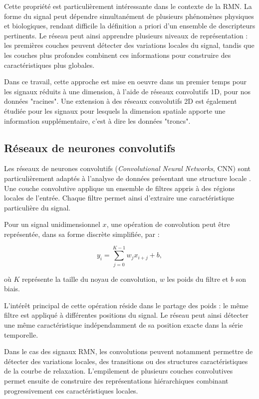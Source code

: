 \documentclass[12pt,a4paper,twoside]{article}
\begin{document}
Cette propriété est particulièrement intéressante dans le contexte de la RMN. La forme du signal peut dépendre simultanément de plusieurs phénomènes physiques et biologiques, rendant difficile la définition a priori d'un ensemble de descripteurs pertinents. Le réseau peut ainsi apprendre plusieurs niveaux de représentation : les premières couches peuvent détecter des variations locales du signal, tandis que les couches plus profondes combinent ces informations pour construire des caractéristiques plus globales.

Dans ce travail, cette approche est mise en oeuvre dans un premier temps pour les signaux réduits à une dimension, à l'aide de réseaux convolutifs 1D, pour nos données "racines". Une extension à des réseaux convolutifs 2D est également étudiée pour les signaux pour lesquels la dimension spatiale apporte une information supplémentaire, c'est à dire les données "troncs".

\subsection{Réseaux de neurones convolutifs}
\label{subsec:cnn}

Les réseaux de neurones convolutifs (\textit{Convolutional Neural Networks}, CNN) sont particulièrement adaptés à l'analyse de données présentant une structure locale \cite{LeCun2015}. Une couche convolutive applique un ensemble de filtres appris à des régions locales de l'entrée. Chaque filtre permet ainsi d'extraire une caractéristique particulière du signal.

Pour un signal unidimensionnel $x$, une opération de convolution peut être représentée, dans sa forme discrète simplifiée, par : 

\begin{equation}
y_i = \sum_{j=0}^{K-1} w_j x_{i+j} + b,
\end{equation}

où $K$ représente la taille du noyau de convolution, $w$ les poids du filtre et $b$ son biais.

L'intérêt principal de cette opération réside dans le partage des poids : le même filtre est appliqué à différentes positions du signal. Le réseau peut ainsi détecter une même caractéristique indépendamment de sa position exacte dans la série temporelle.

Dans le cas des signaux RMN, les convolutions peuvent notamment permettre de détecter des variations locales, des transitions ou des structures caractéristiques de la courbe de relaxation. L'empilement de plusieurs couches convolutives permet ensuite de construire des représentations hiérarchiques combinant progressivement ces caractéristiques locales.
\end{document}
